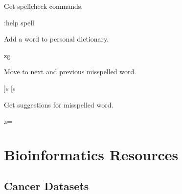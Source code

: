 \documentclass[]{book}
\newenvironment{Shaded}{\begin{snugshade}}{\end{snugshade}}
\newcommand{\VariableTok}[1]{\textcolor[rgb]{0.00,0.00,0.00}{#1}}
\newcommand{\ExtensionTok}[1]{#1}
\newcommand{\NormalTok}[1]{#1}
\begin{document}
Get spellcheck commands.

\begin{Shaded}
\begin{Highlighting}[]
\NormalTok{:}\ExtensionTok{help}\NormalTok{ spell}
\end{Highlighting}
\end{Shaded}

Add a word to personal dictionary.

\begin{Shaded}
\begin{Highlighting}[]
\ExtensionTok{zg}
\end{Highlighting}
\end{Shaded}

Move to next and previous misspelled word.

\begin{Shaded}
\begin{Highlighting}[]
\NormalTok{]}\ExtensionTok{s}
\NormalTok{[}\ExtensionTok{s}
\end{Highlighting}
\end{Shaded}

Get suggestions for misspelled word.

\begin{Shaded}
\begin{Highlighting}[]
\VariableTok{z=}
\end{Highlighting}
\end{Shaded}

\chapter{Bioinformatics Resources}\label{resources}

\section{Cancer Datasets}\label{cancer-datasets}
\end{document}
